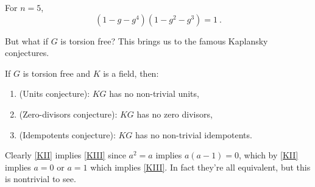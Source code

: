 \begin{exm}
For $n = 5$, 
\begin{equation}
\left(1 - g - g^4\right)\left(1 - g^2 - g^3\right) = 1 \ .
\end{equation}
\end{exm}

But what if $G$ is torsion free?
This brings us to the famous Kaplansky conjectures.

\begin{con}[Kaplansky]
If $G$ is torsion free and $K$ is a field, then:
\begin{enumerate}[label = \III]
\item (Units conjecture): $KG$ has no non-trivial units,
\label{KI}
\item (Zero-divisors conjecture): $KG$ has no zero divisors,
\label{KII}
\item (Idempotents conjecture): $KG$ has no non-trivial idempotents.
\label{KIII}
\end{enumerate}
\end{con}

\begin{rmk}
Clearly
\ref{KII} implies \ref{KIII} since $a^2 = a$ implies $a\left(a-1\right) = 0$, which by
\ref{KII} implies $a = 0$ or $a = 1$ which implies \ref{KIII}.
In fact they're all equivalent, but this is nontrivial to see.
\end{rmk}
